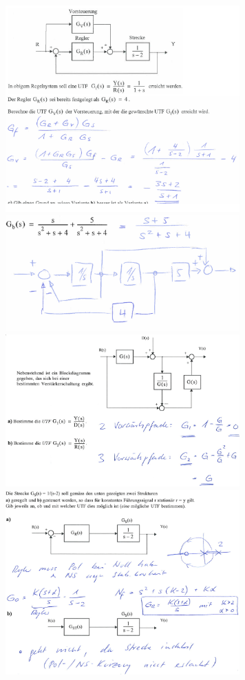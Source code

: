 \begin{multicols}{2}
\includegraphics[width=9cm]{./images/beispiele/beispiel4.png}
\includegraphics[width=9cm]{./images/beispiele/beispiel5.png}
\includegraphics[width=9cm]{./images/beispiele/beispiel6.png}
\includegraphics[width=9cm]{./images/beispiele/beispiel7.png}

\end{multicols}
